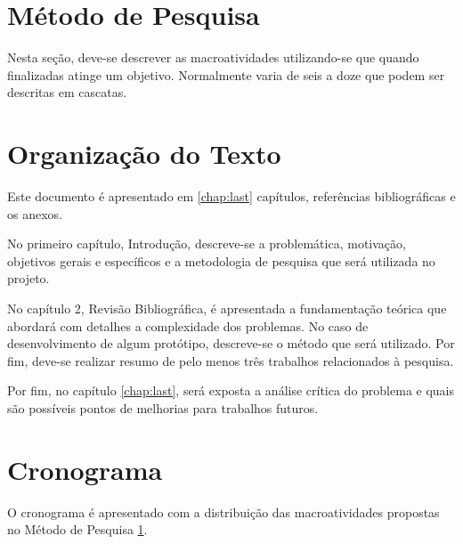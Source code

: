 \section{Método de Pesquisa}
\label{metodo-pesquisa}
Nesta seção, deve-se descrever as macroatividades utilizando-se que quando finalizadas atinge um objetivo. Normalmente varia de seis a doze que podem ser descritas em cascatas. 

\section{Organização do Texto}
Este documento é apresentado em \ref{chap:last} capítulos, referências bibliográficas e os anexos.

No primeiro capítulo, Introdução, descreve-se a problemática, motivação, objetivos gerais e específicos e a metodologia de pesquisa que será utilizada no projeto. 

No capítulo 2, Revisão Bibliográfica, é apresentada a fundamentação teórica que abordará com detalhes a complexidade dos problemas. No caso de desenvolvimento de algum protótipo, descreve-se o método que será utilizado. Por fim, deve-se realizar resumo de pelo menos três trabalhos relacionados à pesquisa.

Por fim, no capítulo \ref{chap:last}, será exposta a análise crítica do problema e quais são possíveis pontos de melhorias para trabalhos futuros.

\section{Cronograma}
O cronograma é apresentado com a distribuição das macroatividades propostas no Método de Pesquisa \ref{metodo-pesquisa}.



